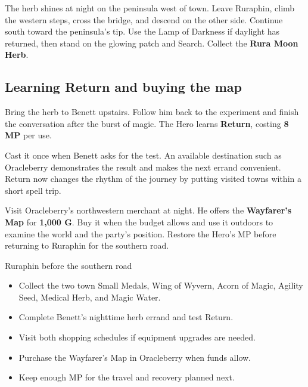 The herb shines at night on the peninsula west of town. Leave Ruraphin,
climb the western steps, cross the bridge, and descend on the other
side. Continue south toward the peninsula's tip. Use the Lamp of Darkness
if daylight has returned, then stand on the glowing patch and Search.
Collect the \textbf{Rura Moon Herb}.

\subsection*{Learning Return and buying the map}

Bring the herb to Benett upstairs. Follow him back to the experiment
and finish the conversation after the burst of magic. The Hero learns
\textbf{Return}, costing \textbf{8 MP} per use.

Cast it once when Benett asks for the test. An available destination
such as Oracleberry demonstrates the result and makes the next errand
convenient. Return now changes the rhythm of the journey by putting
visited towns within a short spell trip.


Visit Oracleberry's northwestern merchant at night. He offers the
\textbf{Wayfarer's Map} for \textbf{1,000 G}. Buy it when the budget
allows and use it outdoors to examine the world and the party's position.
Restore the Hero's MP before returning to Ruraphin for the southern road.


\begin{routecheck}{Ruraphin before the southern road}
\begin{itemize}
  \item Collect the two town Small Medals, Wing of Wyvern, Acorn of
    Magic, Agility Seed, Medical Herb, and Magic Water.
  \item Complete Benett's nighttime herb errand and test Return.
  \item Visit both shopping schedules if equipment upgrades are needed.
  \item Purchase the Wayfarer's Map in Oracleberry when funds allow.
  \item Keep enough MP for the travel and recovery planned next.
\end{itemize}
\end{routecheck}


